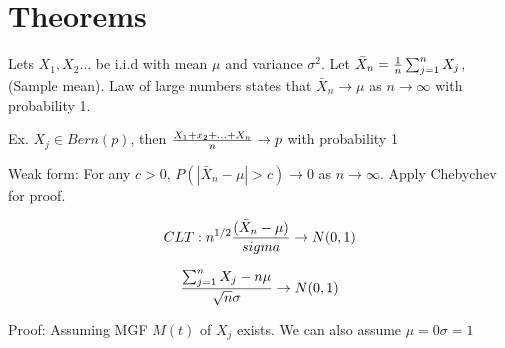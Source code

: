\section{Theorems}
\begin{slide}
Lets $X_1, X_2\ldots$  be i.i.d with mean $\mu$ and variance $\sigma^2$. Let $\bar{X}_n = {1\over n} \sum _{j=1}^{n} X_j$, (Sample mean). Law of large numbers states that $\bar{X}_n \to \mu$ as $n \to \infty$ with probability 1.

Ex. $X_j \in Bern(p)$, then ${X_1+x_2+\ldots+X_n \over n} \to p$ with probability 1


Weak form: For any $c>0$, $P(|\bar{X}_n -\mu| >c)\to 0$ as $n\to \infty$. Apply Chebychev for proof.

\end{slide}

\begin{slide}

$$CLT: n^{1/2} {(\bar{X}_n -\mu)\over sigma} \to N(0,1)$$ 

$${\sum _{j=1}^{n} X_j -n\mu \over \sqrt{n}\sigma} \to N(0,1)$$

Proof: Assuming MGF  $M(t)$ of $X_j$ exists. We can also assume $\mu = 0 \sigma = 1$

\end{slide}

